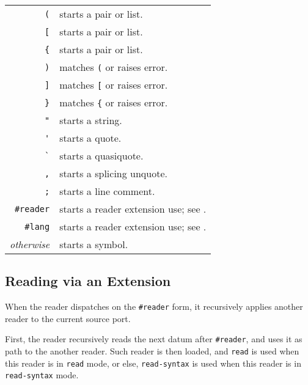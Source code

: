 \begin{tabular}{ r l }
  \lstinline!(! & starts a pair or list. \\
  \lstinline![! & starts a pair or list. \\
  \lstinline!{! & starts a pair or list. \\
  \lstinline!)! & matches \lstinline!(! or raises error. \\
  \lstinline!]! & matches \lstinline![! or raises error. \\
  \lstinline!}! & matches \lstinline!{! or raises error. \\
  \lstinline!"! & starts a string. \\
  \lstinline!'! & starts a quote. \\
  \lstinline!`! & starts a quasiquote. \\
  \lstinline!,! & starts a splicing unquote. \\
  \lstinline!;! & starts a line comment. \\
  
  \lstinline!#reader! & starts a reader extension use; see \nameref{subsec:sec:aml-base-lang-reader-extension}. \\
  \lstinline!#lang! & starts a reader extension use; see \nameref{subsec:sec:aml-base-lang-reader-extension}. \\
  
  {\em otherwise} & starts a symbol. \\
\end{tabular}





\subsection{Reading via an Extension}
\label{subsec:sec:aml-base-lang-reader-extension}

When the reader dispatches on the \lstinline!#reader! form, it recursively applies another reader to the current source port. 


First, the reader recursively reads the next datum after \lstinline!#reader!, and uses it as path to the another reader. Such reader is then loaded, and \lstinline!read! is used when this reader is in \lstinline!read! mode, or else, \lstinline!read-syntax! is used when this reader is in \lstinline!read-syntax! mode.

